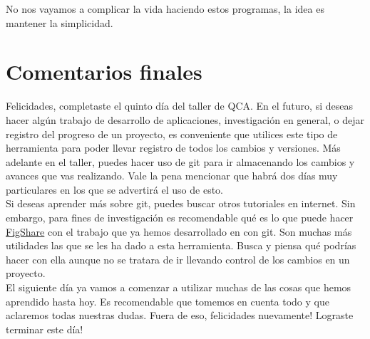 \documentclass[10pt,letterpaper]{article}
\begin{document}
No nos vayamos a complicar la vida haciendo estos programas, la idea es mantener la simplicidad. 

\section{Comentarios finales}
Felicidades, completaste el quinto d\'ia del taller de QCA. En el futuro, si deseas hacer alg\'un trabajo de desarrollo de aplicaciones, investigaci\'on en general, o dejar registro del progreso de un proyecto, es conveniente que utilices este tipo de herramienta para poder llevar registro de todos los cambios y versiones. M\'as adelante en el taller, puedes hacer uso de git para ir almacenando los cambios y avances que vas realizando. Vale la pena mencionar que habr\'a dos d\'ias muy particulares en los que se advertir\'a el uso de esto.\\

Si deseas aprender m\'as sobre git, puedes buscar otros tutoriales en internet. Sin embargo, para fines de investigaci\'on es recomendable qu\'e es lo que puede hacer \href{http://figshare.org/}{FigShare} con el trabajo que ya hemos desarrollado en con git. Son muchas m\'as utilidades las que se les ha dado a esta herramienta. Busca y piensa qu\'e podr\'ias hacer con ella aunque no se tratara de ir llevando control de los cambios en un proyecto.\\

El siguiente d\'ia ya vamos a comenzar a utilizar muchas de las cosas que hemos aprendido hasta hoy. Es recomendable que tomemos en cuenta todo y que aclaremos todas nuestras dudas. Fuera de eso, felicidades nuevamente! Lograste terminar este d\'ia!
\end{document}
